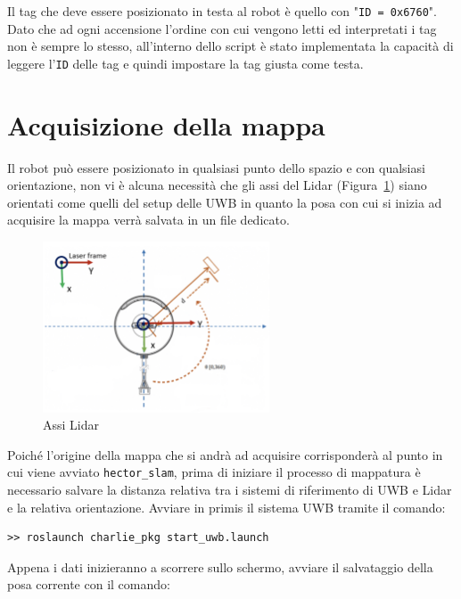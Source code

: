 Il tag che deve essere posizionato in testa al robot è quello con "\verb!ID = 0x6760!".
Dato che ad ogni accensione l’ordine con cui vengono letti ed interpretati i tag non è sempre lo stesso, all’interno dello script è stato implementata la capacità di leggere l’\verb!ID! delle tag e quindi impostare la tag giusta come testa.
\section*{Acquisizione della mappa}

Il robot può essere posizionato in qualsiasi punto dello spazio e con qualsiasi orientazione, non vi è alcuna necessità che gli assi del Lidar (Figura~\ref{fig:lidar_axis}) siano orientati come quelli del setup delle UWB in quanto la posa con cui si inizia ad acquisire la mappa verrà salvata in un file dedicato.

\medskip
\begin{figure}[h] 
\centering    
\includegraphics[width=0.6\textwidth]{Appendice3/Fig/lidar_axis.png}
\caption[Assi Lidar]{Assi Lidar}
\label{fig:lidar_axis}
\end{figure}
\medskip

Poiché l’origine della mappa che si andrà ad acquisire corrisponderà al punto in cui viene avviato \verb!hector_slam!, prima di iniziare il processo di mappatura è necessario salvare la distanza relativa tra i sistemi di riferimento di UWB e Lidar e la relativa orientazione. 
Avviare in primis il sistema UWB tramite il comando:

\medskip
\begin{tcolorbox}
\begin{verbatim}
>> roslaunch charlie_pkg start_uwb.launch
\end{verbatim}
\end{tcolorbox}
Appena i dati inizieranno a scorrere sullo schermo, avviare il salvataggio della posa corrente con il comando:

